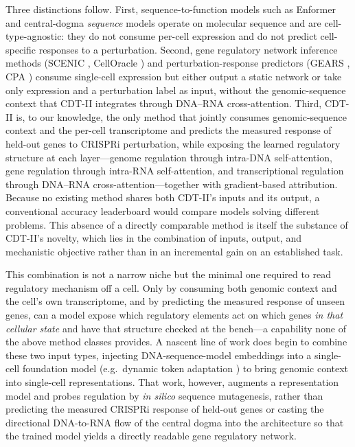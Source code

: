 \documentclass[12pt,a4paper]{article}
\begin{document}
Three distinctions follow. First, sequence-to-function models such as Enformer \citep{avsec2021enformer} and central-dogma \textit{sequence} models operate on molecular sequence and are cell-type-agnostic: they do not consume per-cell expression and do not predict cell-specific responses to a perturbation. Second, gene regulatory network inference methods (SCENIC \citep{aibar2017}, CellOracle \citep{kamimoto2023}) and perturbation-response predictors (GEARS \citep{roohani2024,norman2019}, CPA \citep{lotfollahi2023}) consume single-cell expression but either output a static network or take only expression and a perturbation label as input, without the genomic-sequence context that CDT-II integrates through DNA--RNA cross-attention. Third, CDT-II is, to our knowledge, the only method that jointly consumes genomic-sequence context and the per-cell transcriptome and predicts the measured response of held-out genes to CRISPRi perturbation, while exposing the learned regulatory structure at each layer---genome regulation through intra-DNA self-attention, gene regulation through intra-RNA self-attention, and transcriptional regulation through DNA--RNA cross-attention---together with gradient-based attribution. Because no existing method shares both CDT-II's inputs and its output, a conventional accuracy leaderboard would compare models solving different problems. This absence of a directly comparable method is itself the substance of CDT-II's novelty, which lies in the combination of inputs, output, and mechanistic objective rather than in an incremental gain on an established task.

This combination is not a narrow niche but the minimal one required to read regulatory mechanism off a cell. Only by consuming both genomic context and the cell's own transcriptome, and by predicting the measured response of unseen genes, can a model expose which regulatory elements act on which genes \emph{in that cellular state} and have that structure checked at the bench---a capability none of the above method classes provides. A nascent line of work does begin to combine these two input types, injecting DNA-sequence-model embeddings into a single-cell foundation model (e.g.\ dynamic token adaptation \citep{zhao2025dynamic}) to bring genomic context into single-cell representations. That work, however, augments a representation model and probes regulation by \emph{in silico} sequence mutagenesis, rather than predicting the measured CRISPRi response of held-out genes or casting the directional DNA-to-RNA flow of the central dogma into the architecture so that the trained model yields a directly readable gene regulatory network.
\end{document}
